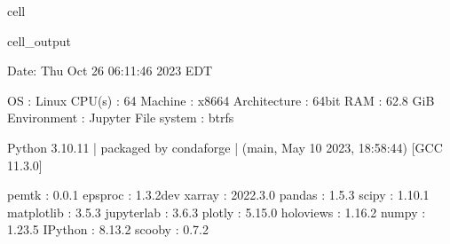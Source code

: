 \documentclass[letterpaper,table,10pt,english]{jupyterBook}
\begin{document}
\begin{sphinxuseclass}{cell}
\begin{sphinxVerbatimOutput}
\begin{sphinxuseclass}{cell_output}
\begin{sphinxVerbatim}[commandchars=\\\{\}]
\PYGZhy{}\PYGZhy{}\PYGZhy{}\PYGZhy{}\PYGZhy{}\PYGZhy{}\PYGZhy{}\PYGZhy{}\PYGZhy{}\PYGZhy{}\PYGZhy{}\PYGZhy{}\PYGZhy{}\PYGZhy{}\PYGZhy{}\PYGZhy{}\PYGZhy{}\PYGZhy{}\PYGZhy{}\PYGZhy{}\PYGZhy{}\PYGZhy{}\PYGZhy{}\PYGZhy{}\PYGZhy{}\PYGZhy{}\PYGZhy{}\PYGZhy{}\PYGZhy{}\PYGZhy{}\PYGZhy{}\PYGZhy{}\PYGZhy{}\PYGZhy{}\PYGZhy{}\PYGZhy{}\PYGZhy{}\PYGZhy{}\PYGZhy{}\PYGZhy{}\PYGZhy{}\PYGZhy{}\PYGZhy{}\PYGZhy{}\PYGZhy{}\PYGZhy{}\PYGZhy{}\PYGZhy{}\PYGZhy{}\PYGZhy{}\PYGZhy{}\PYGZhy{}\PYGZhy{}\PYGZhy{}\PYGZhy{}\PYGZhy{}\PYGZhy{}\PYGZhy{}\PYGZhy{}\PYGZhy{}\PYGZhy{}\PYGZhy{}\PYGZhy{}\PYGZhy{}\PYGZhy{}\PYGZhy{}\PYGZhy{}\PYGZhy{}\PYGZhy{}\PYGZhy{}\PYGZhy{}\PYGZhy{}\PYGZhy{}\PYGZhy{}\PYGZhy{}\PYGZhy{}\PYGZhy{}\PYGZhy{}\PYGZhy{}\PYGZhy{}
  Date: Thu Oct 26 06:11:46 2023 EDT

                OS : Linux
            CPU(s) : 64
           Machine : x86\PYGZus{}64
      Architecture : 64bit
               RAM : 62.8 GiB
       Environment : Jupyter
       File system : btrfs

  Python 3.10.11 | packaged by conda\PYGZhy{}forge | (main, May 10 2023, 18:58:44)
  [GCC 11.3.0]

             pemtk : 0.0.1
           epsproc : 1.3.2\PYGZhy{}dev
            xarray : 2022.3.0
            pandas : 1.5.3
             scipy : 1.10.1
        matplotlib : 3.5.3
        jupyterlab : 3.6.3
            plotly : 5.15.0
         holoviews : 1.16.2
             numpy : 1.23.5
           IPython : 8.13.2
            scooby : 0.7.2
\PYGZhy{}\PYGZhy{}\PYGZhy{}\PYGZhy{}\PYGZhy{}\PYGZhy{}\PYGZhy{}\PYGZhy{}\PYGZhy{}\PYGZhy{}\PYGZhy{}\PYGZhy{}\PYGZhy{}\PYGZhy{}\PYGZhy{}\PYGZhy{}\PYGZhy{}\PYGZhy{}\PYGZhy{}\PYGZhy{}\PYGZhy{}\PYGZhy{}\PYGZhy{}\PYGZhy{}\PYGZhy{}\PYGZhy{}\PYGZhy{}\PYGZhy{}\PYGZhy{}\PYGZhy{}\PYGZhy{}\PYGZhy{}\PYGZhy{}\PYGZhy{}\PYGZhy{}\PYGZhy{}\PYGZhy{}\PYGZhy{}\PYGZhy{}\PYGZhy{}\PYGZhy{}\PYGZhy{}\PYGZhy{}\PYGZhy{}\PYGZhy{}\PYGZhy{}\PYGZhy{}\PYGZhy{}\PYGZhy{}\PYGZhy{}\PYGZhy{}\PYGZhy{}\PYGZhy{}\PYGZhy{}\PYGZhy{}\PYGZhy{}\PYGZhy{}\PYGZhy{}\PYGZhy{}\PYGZhy{}\PYGZhy{}\PYGZhy{}\PYGZhy{}\PYGZhy{}\PYGZhy{}\PYGZhy{}\PYGZhy{}\PYGZhy{}\PYGZhy{}\PYGZhy{}\PYGZhy{}\PYGZhy{}\PYGZhy{}\PYGZhy{}\PYGZhy{}\PYGZhy{}\PYGZhy{}\PYGZhy{}\PYGZhy{}\PYGZhy{}
\end{sphinxVerbatim}

\end{sphinxuseclass}\end{sphinxVerbatimOutput}

\end{sphinxuseclass}
\end{document}
